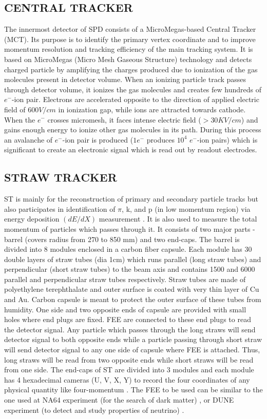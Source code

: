 \documentclass[12pt, twocolumn]{article}
\begin{document}
\subsection{CENTRAL TRACKER}
The innermost detector of SPD consists of a MicroMegas-based Central Tracker (MCT). Its purpose is to identify the primary vertex coordinate and to improve momentum resolution and tracking efficiency of the main tracking system. It is based on MicroMegas (Micro Mesh Gaseous Structure) technology and detects charged particle by amplifying the charges produced due to ionization of the gas molecules present in detector volume. When an ionizing particle track passes through detector volume, it ionizes the gas molecules and creates few hundreds of $e^{-}$-ion pair. Electrons are accelerated opposite to the direction of applied electric field of $600 V/cm$ in ionization gap, while ions are attracted towards cathode. When the $e^{-}$ crosses micromesh, it faces intense electric field ($>30KV/cm$) and gains enough energy to ionize other gas molecules in its path. During this process an avalanche of $e^{-}$-ion pair is produced ($1e^{-}$ produces $10^4$ $e^{-}$-ion pairs) which is significant to create an electronic signal which is read out by readout electrodes.   

\subsection{STRAW TRACKER}
\label{STRAW TRACKER}
ST is mainly for the reconstruction of primary and secondary particle tracks but also participates in identification of $\pi$, k, and p (in low momentum region) via energy deposition $(dE/dX)$ measurement \cite{kekelidze2013project}. It is also used to measure the total momentum of particles which passes through it. It consists of two major parts - barrel (covers radius from 270 to 850 mm) and two end-caps. The barrel is divided into 8 modules enclosed in a carbon fiber capsule. Each module has 30 double layers of straw tubes (dia 1cm) which runs parallel (long straw tubes) and perpendicular (short straw tubes) to the beam axis and contains 1500 and 6000 parallel and perpendicular straw tubes respectively. Straw tubes are made of polyethylene terephthalate and outer surface is coated with very thin layer of Cu and Au. Carbon capsule is meant to protect the outer surface of these tubes from humidity. One side and two opposite ends of capsule are provided with small holes where end plugs are fixed. FEE are connected to these end plugs to read the detector signal. Any particle which passes through the long straws will send detector signal to both opposite ends while a particle passing through short straw will send detector signal to any one side of capsule where FEE is attached. Thus, long straws will be read from two opposite ends while short straws will be read from one side. The end-caps of ST are divided into 3 modules and each module has 4 hexadecimal cameras (U, V, X, Y) to record the four coordinates of any physical quantity like four-momentum \cite{abazov2021conceptual}. The FEE to be used can be similar to the one used at NA64 experiment (for the search of dark matter) \cite{volkov2019straw}, or DUNE experiment (to detect and study properties of neutrino) \cite{acciarri2016long}.
\end{document}
